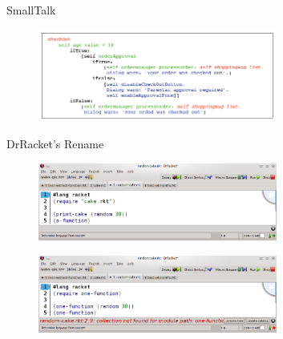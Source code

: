 \documentclass[xcolor=dvipsnames]{beamer}
\begin{document}
\begin{frame}{SmallTalk}
  \begin{figure}[htbp]
    \centering
    \includegraphics[width=0.7\textwidth]{img/SmalltalkCode.gif}
    \label{fig:Smalltalk}
  \end{figure}
\end{frame}

\begin{frame}{DrRacket's Rename}
\begin{figure}[htbp]
  \centering
  \includegraphics[width=0.7\textwidth]{img/renameV2-1.png}
  \label{fig:renameBefore}
\end{figure}

\begin{figure}[htbp]
  \centering
  \includegraphics[width=0.7\textwidth]{img/rename-error.png}
  \label{fig:RacketBug}
\end{figure}
\end{frame}
\end{document}
